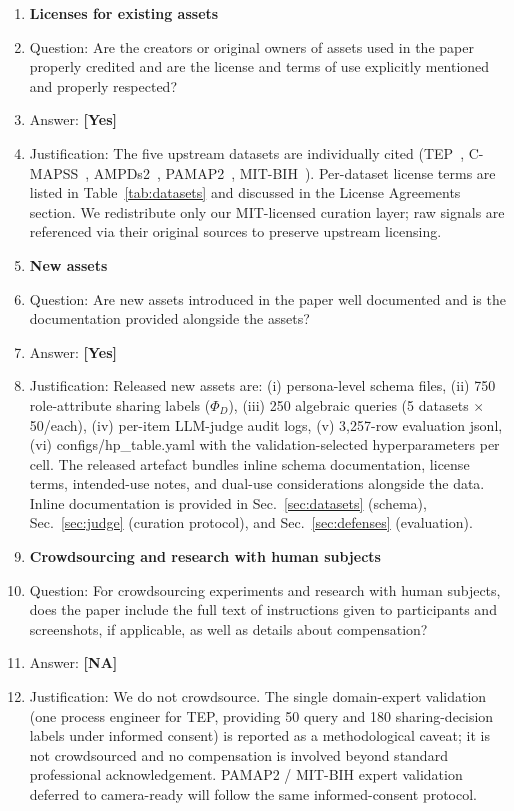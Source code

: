 \documentclass{article}
\theoremstyle{remark}
\begin{document}
\begin{enumerate}
\item {\bf Licenses for existing assets}
\item[] Question: Are the creators or original owners of assets used in the paper properly credited and are the license and terms of use explicitly mentioned and properly respected?
\item[] Answer: \textbf{[Yes]}
\item[] Justification: The five upstream datasets are individually cited (TEP~\cite{tep1993,tep_ext}, C-MAPSS~\cite{cmapss}, AMPDs2~\cite{ampds2}, PAMAP2~\cite{pamap2}, MIT-BIH~\cite{mitbih}). Per-dataset license terms are listed in Table~\ref{tab:datasets} and discussed in the License Agreements section. We redistribute only our MIT-licensed curation layer; raw signals are referenced via their original sources to preserve upstream licensing.

\item {\bf New assets}
\item[] Question: Are new assets introduced in the paper well documented and is the documentation provided alongside the assets?
\item[] Answer: \textbf{[Yes]}
\item[] Justification: Released new assets are: (i) persona-level schema files, (ii) 750 role-attribute sharing labels ($\Phi_D$), (iii) 250 algebraic queries (5 datasets $\times$ 50/each), (iv) per-item LLM-judge audit logs, (v) 3{,}257-row evaluation jsonl, (vi) configs/hp\_table.yaml with the validation-selected hyperparameters per cell. The released artefact bundles inline schema documentation, license terms, intended-use notes, and dual-use considerations alongside the data. Inline documentation is provided in Sec.~\ref{sec:datasets} (schema), Sec.~\ref{sec:judge} (curation protocol), and Sec.~\ref{sec:defenses} (evaluation).

\item {\bf Crowdsourcing and research with human subjects}
\item[] Question: For crowdsourcing experiments and research with human subjects, does the paper include the full text of instructions given to participants and screenshots, if applicable, as well as details about compensation?
\item[] Answer: \textbf{[NA]}
\item[] Justification: We do not crowdsource. The single domain-expert validation (one process engineer for TEP, providing 50 query and 180 sharing-decision labels under informed consent) is reported as a methodological caveat; it is not crowdsourced and no compensation is involved beyond standard professional acknowledgement. PAMAP2 / MIT-BIH expert validation deferred to camera-ready will follow the same informed-consent protocol.


\end{enumerate}
\end{document}
